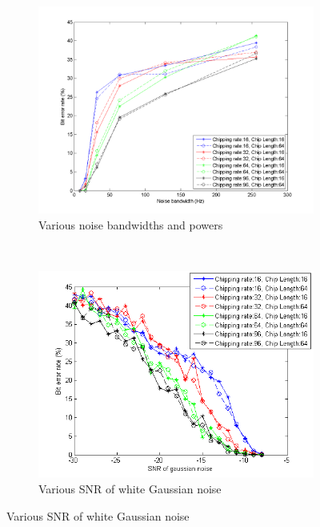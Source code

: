 		\begin{figure}[H]
			\centering
			\begin{subfigure}[b]{0.5\textwidth}
				\includegraphics[width=\textwidth]{imgs/results/plot_mode_dsss-test_bandwidthAndPower-rep_20-dataRate_8-dataLength_128.png}
				\caption{Various noise bandwidths and powers}
				\label{fig:dsss_bandwidth}
			\end{subfigure}%
			~
			\begin{subfigure}[b]{0.5\textwidth}
				\includegraphics[width=\textwidth]{imgs/results/plot_mode_dsss-test_gaussianSNR-rep_20-dataRate_8-dataLength_128_fixedlegend.png}
				\caption{Various SNR of white Gaussian noise}
				\label{fig:dsss_gaussian}
			\end{subfigure}
		\end{figure}		
		

